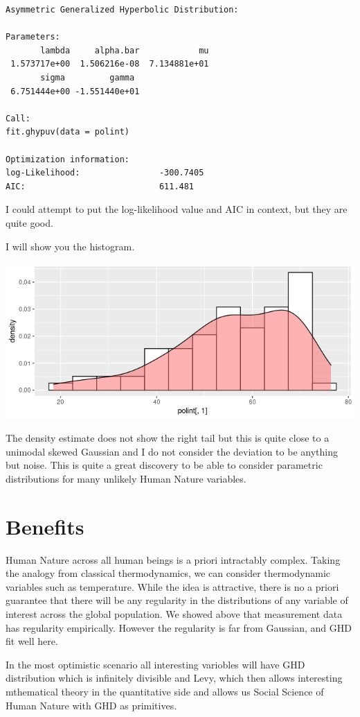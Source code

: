 \documentclass{amsart}
\begin{document}
\begin{verbatim}
Asymmetric Generalized Hyperbolic Distribution:

Parameters:
       lambda     alpha.bar            mu
 1.573717e+00  1.506216e-08  7.134881e+01                
       sigma         gamma 
 6.751444e+00 -1.551440e+01 

Call:
fit.ghypuv(data = polint)

Optimization information:
log-Likelihood:                -300.7405 
AIC:                           611.481 
\end{verbatim}
I could attempt to put the log-likelihood value and AIC in context, but they are quite good.  

I will show you the histogram.

\includegraphics[scale=0.6]{unpolitical.png}

The density estimate does not show the right tail but this is quite close to a unimodal skewed Gaussian and I do not consider the deviation to be anything but noise.  This is quite a great discovery to be able to consider parametric distributions for many unlikely Human Nature variables.  

\section{Benefits}

Human Nature across all human beings is a priori intractably complex.  Taking the analogy from classical thermodynamics, we can consider thermodynamic variables such as temperature.  While the idea is attractive, there is no a priori guarantee that there will be any regularity in the distributions of any variable of interest across the global population.  We showed above that measurement data has regularity empirically.  However the regularity is far from Gaussian, and GHD fit well here.

In the most optimistic scenario all interesting variobles will have GHD distribution which is infinitely divisible and Levy, which then allows interesting mthematical theory in the quantitative side and allows us Social Science of Human Nature with GHD as primitives.
\end{document}
